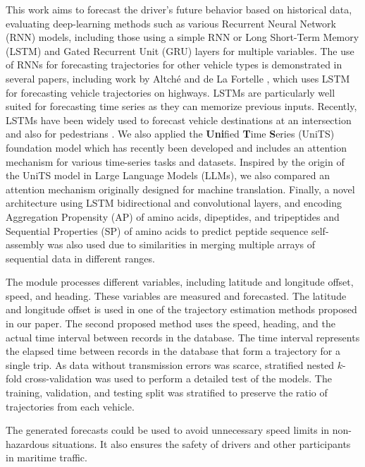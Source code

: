 \documentclass[preprint,12pt]{elsarticle}
\begin{document}
This work aims to forecast the driver's future behavior based on historical data, evaluating deep-learning methods such as various Recurrent Neural Network (RNN) models, including those using a simple RNN or Long Short-Term Memory (LSTM) \citep{hochreiter1997long} and Gated Recurrent Unit (GRU) layers for multiple variables. The use of RNNs for forecasting trajectories for other vehicle types is demonstrated in several papers, including work by Altché and de La Fortelle \citep{altche2017lstm}, which uses LSTM for forecasting vehicle trajectories on highways. LSTMs are particularly well suited for forecasting time series \citep{gers2000learning} as they can memorize previous inputs. Recently, LSTMs have been widely used to forecast vehicle destinations at an intersection \citep{phillips2017generalizable, zyner2017long} and also for pedestrians \citep{duan2016travel, alahi2016social}. We also applied the \textbf{Uni}fied \textbf{T}ime \textbf{S}eries (UniTS) foundation model which has recently been developed and includes an attention mechanism for various time-series tasks and datasets. Inspired by the origin of the UniTS model in Large Language Models (LLMs), we also compared an attention mechanism originally designed for machine translation. Finally, a novel architecture using LSTM bidirectional and convolutional layers, and encoding Aggregation Propensity (AP) of amino acids, dipeptides, and tripeptides and Sequential Properties (SP) of amino acids to predict peptide sequence self-assembly was also used due to similarities in merging multiple arrays of sequential data in different ranges.

The module processes different variables, including latitude and longitude offset, speed, and heading. These variables are measured and forecasted. The latitude and longitude offset is used in one of the trajectory estimation methods proposed in our paper. The second proposed method uses the speed, heading, and the actual time interval between records in the database. The time interval represents the elapsed time between records in the database that form a trajectory for a single trip. As data without transmission errors was scarce, stratified nested $k$-fold cross-validation was used to perform a detailed test of the models. The training, validation, and testing split was stratified to preserve the ratio of trajectories from each vehicle.

The generated forecasts could be used to avoid unnecessary speed limits in non-hazardous situations. It also ensures the safety of drivers and other participants in maritime traffic.
\end{document}
